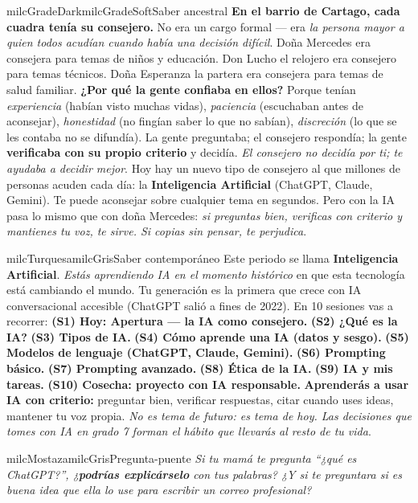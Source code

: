 \documentclass[11pt,letterpaper]{article}
\begin{document}
\begin{softbox}{milcGradeDark}{milcGradeSoft}{Saber ancestral}
\textbf{En el barrio de Cartago, cada cuadra tenía su consejero.} No era un cargo formal --- era \emph{la persona mayor a quien todos acudían cuando había una decisión difícil}. Doña Mercedes era consejera para temas de niños y educación. Don Lucho el relojero era consejero para temas técnicos. Doña Esperanza la partera era consejera para temas de salud familiar. \textbf{¿Por qué la gente confiaba en ellos?} Porque tenían \emph{experiencia} (habían visto muchas vidas), \emph{paciencia} (escuchaban antes de aconsejar), \emph{honestidad} (no fingían saber lo que no sabían), \emph{discreción} (lo que se les contaba no se difundía). La gente preguntaba; el consejero respondía; la gente \textbf{verificaba con su propio criterio} y decidía. \emph{El consejero no decidía por ti; te ayudaba a decidir mejor}. Hoy hay un nuevo tipo de consejero al que millones de personas acuden cada día: la \textbf{Inteligencia Artificial} (ChatGPT, Claude, Gemini). Te puede aconsejar sobre cualquier tema en segundos. Pero con la IA pasa lo mismo que con doña Mercedes: \emph{si preguntas bien, verificas con criterio y mantienes tu voz, te sirve. Si copias sin pensar, te perjudica}.
\end{softbox}

\begin{softbox}{milcTurquesa}{milcGris}{Saber contemporáneo}
Este periodo se llama \textbf{Inteligencia Artificial}. \emph{Estás aprendiendo IA en el momento histórico} en que esta tecnología está cambiando el mundo. Tu generación es la primera que crece con IA conversacional accesible (ChatGPT salió a fines de 2022). En 10 sesiones vas a recorrer: \textbf{(S1) Hoy: Apertura --- la IA como consejero.} \textbf{(S2) ¿Qué es la IA?} \textbf{(S3) Tipos de IA.} \textbf{(S4) Cómo aprende una IA (datos y sesgo).} \textbf{(S5) Modelos de lenguaje (ChatGPT, Claude, Gemini).} \textbf{(S6) Prompting básico.} \textbf{(S7) Prompting avanzado.} \textbf{(S8) Ética de la IA.} \textbf{(S9) IA y mis tareas.} \textbf{(S10) Cosecha: proyecto con IA responsable.} \textbf{Aprenderás a usar IA con criterio:} preguntar bien, verificar respuestas, citar cuando uses ideas, mantener tu voz propia. \emph{No es tema de futuro: es tema de hoy. Las decisiones que tomes con IA en grado 7 forman el hábito que llevarás al resto de tu vida}.
\end{softbox}

\begin{softbox}{milcMostaza}{milcGris}{Pregunta-puente}
\textit{Si tu mamá te pregunta \emph{``¿qué es ChatGPT?''}, ¿\textbf{podrías explicárselo} con tus palabras? ¿Y si te preguntara si es buena idea que ella lo use para escribir un correo profesional?}
\end{softbox}
\end{document}
